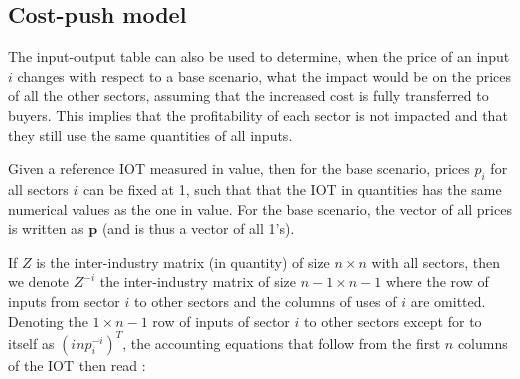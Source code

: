 \documentclass[12pt,english]{article}
\newcommand{\mli}[1]{\mathit{#1}}
\begin{document}
%
%
%
%

\subsection{Cost-push model}

The input-output table can also be used to determine, when the price of an input $i$ changes with respect to a base scenario, what the impact would be on the prices of all the other sectors, assuming that the increased cost is fully transferred to buyers. This implies that the profitability of each sector is not impacted and that they still use the same quantities of all inputs. 

Given a reference IOT measured in value, then for the base scenario, prices $p_i$ for all sectors $i$ can be fixed at 1, such that that the IOT in quantities has the same numerical values as the one in value. For the base scenario, the vector of all prices is written as $\boldsymbol{p}$ (and is thus a vector of all 1's).

If $Z$ is the inter-industry matrix (in quantity) of size $n\times n$ with all sectors, then we denote $Z^{-i}$ the inter-industry matrix of size $n-1 \times n-1$ where the row of inputs from sector $i$ to other sectors and the columns of uses of $i$ are omitted. Denoting the $1 \times n-1$ row of inputs of sector $i$ to other sectors except for to itself as $(inp^{-i}_i)^T$, the accounting equations that follow from the first $n$ columns of the IOT then read :
\end{document}
